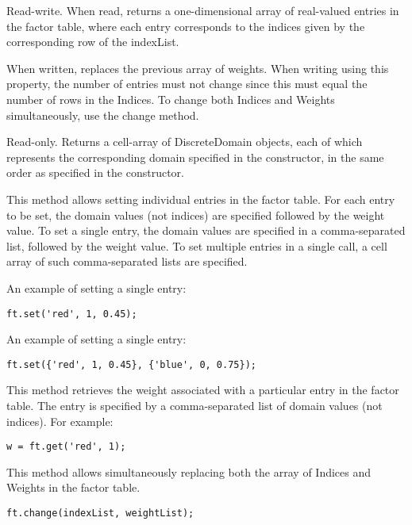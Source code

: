 
Read-write.  When read, returns a one-dimensional array of real-valued entries in the factor table, where each entry corresponds to the indices given by the corresponding row of the indexList.

When written, replaces the previous array of weights.  When writing using this property, the number of entries must not change since this must equal the number of rows in the Indices.  To change both Indices and Weights simultaneously, use the change method.


Read-only.  Returns a cell-array of DiscreteDomain objects, each of which represents the corresponding domain specified in the constructor, in the same order as specified in the constructor.



\label{sec:FactorTable.set}

This method allows setting individual entries in the factor table.  For each entry to be set, the domain values (not indices) are specified followed by the weight value.  To set a single entry, the domain values are specified in a comma-separated list, followed by the weight value.  To set multiple entries in a single call, a cell array of such comma-separated lists are specified.

An example of setting a single entry:
\begin{lstlisting}
ft.set('red', 1, 0.45);
\end{lstlisting}

An example of setting a single entry:
\begin{lstlisting}
ft.set({'red', 1, 0.45}, {'blue', 0, 0.75});
\end{lstlisting}



This method retrieves the weight associated with a particular entry in the factor table.  The entry is specified by a comma-separated list of domain values (not indices).  For example:

\begin{lstlisting}
w = ft.get('red', 1);
\end{lstlisting}



This method allows simultaneously replacing both the array of Indices and Weights in the factor table.

\begin{lstlisting}
ft.change(indexList, weightList);
\end{lstlisting}

